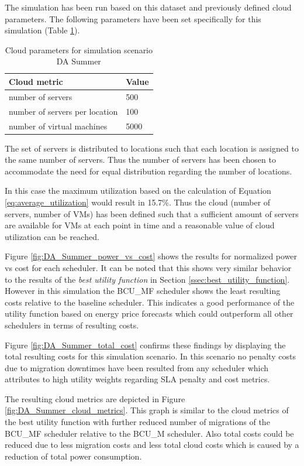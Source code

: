 The simulation has been run based on this dataset and previously defined cloud parameters. 
The following parameters have been set specifically for this simulation (Table \ref{tab:da_summer_cloud_parameters}). 


\begin{table}[htbp]
\centering
\begin{tabular}[\textwidth]{ll}
\toprule
	Cloud metric & Value  \\
\midrule
	number of servers & 500 \\
	number of servers per location & 100 \\
	number of virtual machines & 5000\\
\bottomrule
\end{tabular}
\caption{Cloud parameters for simulation scenario DA Summer}
\label{tab:da_summer_cloud_parameters}
\end{table}

The set of servers is distributed to locations such that each location is assigned to the same number of servers. Thus the number of servers has been chosen to accommodate the need for equal distribution regarding the number of locations. 


In this case the maximum utilization based on the calculation of Equation \ref{eq:average_utilization} would result in 15.7\%. 
Thus the cloud (number of servers, number of VMs) has been defined such that a sufficient amount of servers are available for VMs at each point in time and a reasonable value of cloud utilization can be reached. 


Figure \ref{fig:DA_Summer_power_vs_cost} shows the results for normalized power vs cost for each scheduler. 
It can be noted that this shows very similar behavior to the results of the \textit{best utility function} in Section \ref{ssec:best_utility_function}. However in this simulation the BCU\_MF scheduler shows the least resulting costs relative to the baseline scheduler. This indicates a good performance of the utility function based on energy price forecasts which could outperform all other schedulers in terms of resulting costs. 

Figure \ref{fig:DA_Summer_total_cost} confirms these findings by displaying the total resulting costs for this simulation scenario. 
In this scenario no penalty costs due to migration downtimes have been resulted from any scheduler which attributes to high utility weights regarding SLA penalty and cost metrics. 

The resulting cloud metrics are depicted in Figure \ref{fig:DA_Summer_cloud_metrics}. This graph is similar to the cloud metrics of the best utility function with further reduced number of migrations of the BCU\_MF scheduler relative to the BCU\_M scheduler. Also total costs could be reduced due to less migration costs and less total cloud costs which is caused by a reduction of total power consumption. 

